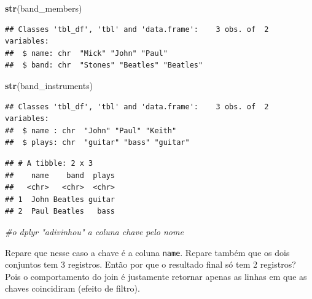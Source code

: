 \documentclass[]{book}
\newenvironment{Shaded}{\begin{snugshade}}{\end{snugshade}}
\newcommand{\KeywordTok}[1]{\textcolor[rgb]{0.13,0.29,0.53}{\textbf{#1}}}
\newcommand{\StringTok}[1]{\textcolor[rgb]{0.31,0.60,0.02}{#1}}
\newcommand{\CommentTok}[1]{\textcolor[rgb]{0.56,0.35,0.01}{\textit{#1}}}
\newcommand{\OperatorTok}[1]{\textcolor[rgb]{0.81,0.36,0.00}{\textbf{#1}}}
\newcommand{\NormalTok}[1]{#1}
\begin{document}
\begin{Shaded}
\begin{Highlighting}[]
\KeywordTok{str}\NormalTok{(band_members)}
\end{Highlighting}
\end{Shaded}

\begin{verbatim}
## Classes 'tbl_df', 'tbl' and 'data.frame':    3 obs. of  2 variables:
##  $ name: chr  "Mick" "John" "Paul"
##  $ band: chr  "Stones" "Beatles" "Beatles"
\end{verbatim}

\begin{Shaded}
\begin{Highlighting}[]
\KeywordTok{str}\NormalTok{(band_instruments)}
\end{Highlighting}
\end{Shaded}

\begin{verbatim}
## Classes 'tbl_df', 'tbl' and 'data.frame':    3 obs. of  2 variables:
##  $ name : chr  "John" "Paul" "Keith"
##  $ plays: chr  "guitar" "bass" "guitar"
\end{verbatim}

\begin{Shaded}
\end{Shaded}

\begin{verbatim}
## # A tibble: 2 x 3
##    name    band  plays
##   <chr>   <chr>  <chr>
## 1  John Beatles guitar
## 2  Paul Beatles   bass
\end{verbatim}

\begin{Shaded}
\begin{Highlighting}[]
\CommentTok{#o dplyr "adivinhou" a coluna chave pelo nome}
\end{Highlighting}
\end{Shaded}

Repare que nesse caso a chave é a coluna \texttt{name}. Repare também
que os dois conjuntos tem 3 registros. Então por que o resultado final
só tem 2 registros? Pois o comportamento do join é justamente retornar
apenas as linhas em que as chaves coincidiram (efeito de filtro).
\end{document}
